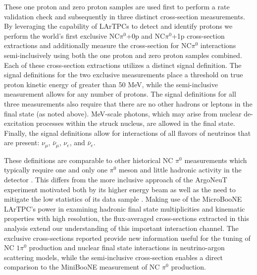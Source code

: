 These one proton and zero proton samples are used first to perform a rate validation check and subsequently in three distinct cross-section measurements. By leveraging the capability of LArTPCs to detect and identify protons we perform the world's first exclusive NC$\pi^0$+0p and NC$\pi^0$+1p cross-section extractions and additionally measure the cross-section for NC$\pi^0$ interactions semi-inclusively using both the one proton and zero proton samples combined. Each of these cross-section extractions utilizes a distinct signal definition. The signal definitions for the two exclusive measurements place a threshold on true proton kinetic energy of greater than 50 MeV, while the semi-inclusive measurement allows for any number of protons. The signal definitions for all three measurements also require that there are no other hadrons or leptons in the final state (as noted above). MeV-scale photons, which may arise from nuclear de-excitation processes within the struck nucleus, are allowed in the final state. Finally, the signal definitions allow for interactions of all flavors of neutrinos that are present: $\nu_\mu$, $\bar{\nu}_\mu$, $\nu_e$, and $\bar{\nu}_e$.

These definitions are comparable to other historical NC $\pi^0$ measurements which typically require one and only one $\pi^0$ meson and little hadronic activity in the detector \cite{Barish:1974fe,Derrick:1980xw,Lee:1976wr,GargamelleNeutrinoPropane:1977hya,MiniBooNE:2008mmr,MiniBooNE2011,MiniBooNE:2009dxl,SciBooNE:2010NCpi0,K2K:2004qpv,T2K:2017epu}. This differs from the more inclusive approach of the ArgoNeuT experiment motivated both by its higher energy beam as well as the need to mitigate the low statistics of its data sample \cite{ArgoNeuT:2015ldo}. Making use of the MicroBooNE LArTPC's power in examining hadronic final state multiplicities and kinematic properties with high resolution, the flux-averaged cross-sections extracted in this analysis extend our understanding of this important interaction channel. The exclusive cross-sections reported provide new information useful for the tuning of NC $1\pi^0$ production and nuclear final state interactions in neutrino-argon scattering models, while the semi-inclusive cross-section enables a direct comparison to the MiniBooNE measurement of NC $\pi^0$ production.
